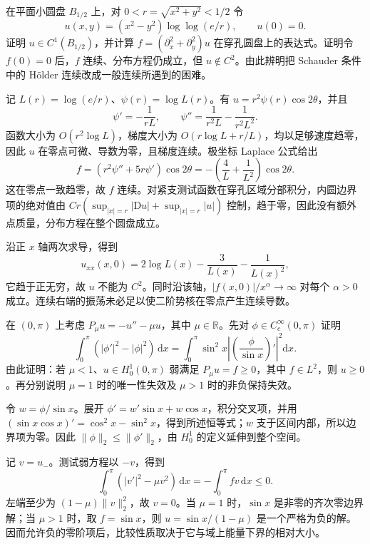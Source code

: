 \begin{exercise}\label{g3:ex:continuous-rhs-not-c2}
	在平面小圆盘 \(B_{1/2}\) 上，对 \(0<r=\sqrt{x^2+y^2}<1/2\) 令
	\[
		u(x,y)=(x^2-y^2)\log\log(e/r),\qquad u(0)=0.
	\]
	证明 \(u\in C^1(B_{1/2})\)，并计算 \(f=(\partial_x^2+\partial_y^2)u\) 在穿孔圆盘上的表达式。证明令 \(f(0)=0\) 后，\(f\) 连续、分布方程仍成立，但 \(u\notin C^2\)。由此辨明把 Schauder 条件中的 Hölder 连续改成一般连续所遇到的困难。
\end{exercise}
\begin{solution}
	记 \(L(r)=\log(e/r)\)、\(\psi(r)=\log L(r)\)。有 \(u=r^2\psi(r)\cos2\theta\)，并且
	\[
		\psi'=-\frac1{rL},\qquad
		\psi''=\frac1{r^2L}-\frac1{r^2L^2}.
	\]
	函数大小为 \(O(r^2\log L)\)，梯度大小为 \(O(r\log L+r/L)\)，均以足够速度趋零，因此 \(u\) 在零点可微、导数为零，且梯度连续。极坐标 Laplace 公式给出
	\[
		f=(r^2\psi''+5r\psi')\cos2\theta
		=-\left(\frac4L+\frac1{L^2}\right)\cos2\theta.
	\]
	这在零点一致趋零，故 \(f\) 连续。对紧支测试函数在穿孔区域分部积分，内圆边界项的绝对值由
	\(C r(\sup_{|x|=r}|\mathrm Du|+\sup_{|x|=r}|u|)\) 控制，趋于零，因此没有额外点质量，分布方程在整个圆盘成立。

	沿正 \(x\) 轴两次求导，得到
	\[
		u_{xx}(x,0)=2\log L(x)-\frac3{L(x)}-\frac1{L(x)^2},
	\]
	它趋于正无穷，故 \(u\) 不能为 \(C^2\)。同时沿该轴，\(|f(x,0)|/x^\alpha\to\infty\) 对每个 \(\alpha>0\) 成立。连续右端的振荡未必足以使二阶势核在零点产生连续导数。
\end{solution}

\begin{exercise}\label{g3:ex:maximum-spectral-threshold}
	在 \((0,\pi)\) 上考虑 \(P_\mu u=-u''-\mu u\)，其中 \(\mu\in\mathbb R\)。先对 \(\phi\in C_c^\infty(0,\pi)\) 证明
	\[
		\int_0^\pi(|\phi'|^2-|\phi|^2)\,\mathrm dx
		=\int_0^\pi\sin^2x\left|\left(\frac\phi{\sin x}\right)'\right|^2\mathrm dx.
	\]
	由此证明：若 \(\mu<1\)、\(u\in H_0^1(0,\pi)\) 弱满足 \(P_\mu u=f\ge0\)，其中 \(f\in L^2\)，则 \(u\ge0\)。再分别说明 \(\mu=1\) 时的唯一性失效及 \(\mu>1\) 时的非负保持失效。
\end{exercise}
\begin{solution}
	令 \(w=\phi/\sin x\)。展开 \(\phi'=w'\sin x+w\cos x\)，积分交叉项，并用
	\((\sin x\cos x)'=\cos^2x-\sin^2x\)，得到所述恒等式；\(w\) 支于区间内部，所以边界项为零。因此 \(\|\phi\|_2\le\|\phi'\|_2\)，由 \(H_0^1\) 的定义延伸到整个空间。

	记 \(v=u_-\)。测试弱方程以 \(-v\)，得到
	\[
		\int_0^\pi(|v'|^2-\mu v^2)\,\mathrm dx
		=-\int_0^\pi fv\,\mathrm dx\le0.
	\]
	左端至少为 \((1-\mu)\|v\|_2^2\)，故 \(v=0\)。当 \(\mu=1\) 时，\(\sin x\) 是非零的齐次零边界解；当 \(\mu>1\) 时，取 \(f=\sin x\)，则
	\(u=\sin x/(1-\mu)\) 是一个严格为负的解。因而允许负的零阶项后，比较性质取决于它与域上能量下界的相对大小。
\end{solution}

